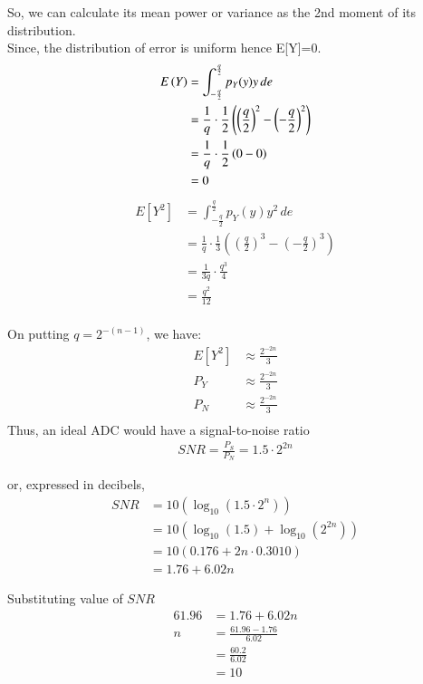 \documentclass[journal,12pt,onecolumn]{IEEEtran}
\begin{document}
So, we can calculate its mean power or variance as the 2nd moment of its distribution.\\
Since, the distribution of error is uniform hence E[Y]=0.\\
\begin{align}
E\left(Y\right) &= \int_{-\frac{q}{2}}^{\frac{q}{2}} p_Y(y) y \, de \\
&= \frac{1}{q} \cdot \frac{1}{2} \left(\left(\frac{q}{2}\right)^{2} - \left(-\frac{q}{2}\right)^{2}\right) \\
&= \frac{1}{q} \cdot \frac{1}{2} \left(0 - 0\right)\\
&= 0
\end{align}
\begin{align} 
E[Y^{2}] &= \int_{-\frac{q}{2}}^{\frac{q}{2}} p_Y(y) y^{2} \, de \\
&= \frac{1}{q} \cdot \frac{1}{3} \left(\left(\frac{q}{2}\right)^{3} - \left(-\frac{q}{2}\right)^{3}\right)  \\
&=\frac{1}{3q} \cdot \frac{q^{3}}{4}\\
&=\frac{q^{2}}{12}\\
\end{align}

On putting \(q = 2^{-(n-1)}\), we have:
\begin{align}
E[Y^{2}] &\approx \frac{2^{-2n}}{3}  \\
P_Y &\approx \frac{2^{-2n}}{3}\\
P_N &\approx \frac{2^{-2n}}{3}\\
\end{align}
Thus, an ideal ADC would have a signal-to-noise ratio
\begin{align}
SNR = \frac{P_S}{P_N} = 1.5 \cdot 2^{2n}
\end{align}

or, expressed in decibels,
\begin{align}
SNR &= 10 \left(\log_{10}(1.5 \cdot 2^{n})\right)\\
&= 10 \left(\log_{10}(1.5) + \log_{10}(2^{2n})\right)\\
&= 10 \left(0.176 + 2n \cdot 0.3010\right)\\
&= 1.76 + 6.02n
\end{align}

Substituting value of $SNR$
\begin{align}
61.96 &= 1.76 +6.02n \\
n &= \frac{61.96 -1.76}{6.02}\\
&= \frac{60.2}{6.02}\\
&= 10
\end{align}
\end{document}
